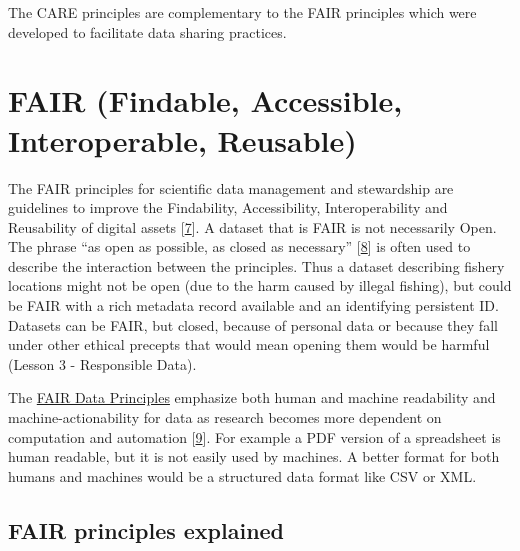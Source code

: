 \documentclass[
  letterpaper,
  DIV=11,
  numbers=noendperiod]{scrreport}
\begin{document}
The CARE principles are complementary to the FAIR principles which were
developed to facilitate data sharing practices.

\hypertarget{fair-findable-accessible-interoperable-reusable}{%
\section{FAIR (Findable, Accessible, Interoperable,
Reusable)}\label{fair-findable-accessible-interoperable-reusable}}

The FAIR principles for scientific data management and stewardship are
guidelines to improve the Findability, Accessibility, Interoperability
and Reusability of digital assets
{[}\href{https://doi.org/10.1038/sdata.2016.18}{7}{]}. A dataset that is
FAIR is not necessarily Open. The phrase ``as open as possible, as
closed as necessary''
{[}\href{https://ec.europa.eu/research/participants/data/ref/h2020/grants_manual/hi/oa_pilot/h2020-hi-oa-data-mgt_en.pdf}{8}{]}
is often used to describe the interaction between the principles. Thus a
dataset describing fishery locations might not be open (due to the harm
caused by illegal fishing), but could be FAIR with a rich metadata
record available and an identifying persistent ID. Datasets can be FAIR,
but closed, because of personal data or because they fall under other
ethical precepts that would mean opening them would be harmful (Lesson 3
- Responsible Data).

The \href{https://www.go-fair.org/fair-principles/}{FAIR Data
Principles} emphasize both human and machine readability and
machine-actionability for data as research becomes more dependent on
computation and automation
{[}\href{https://www.go-fair.org/fair-principles/}{9}{]}. For example a
PDF version of a spreadsheet is human readable, but it is not easily
used by machines. A better format for both humans and machines would be
a structured data format like CSV or XML.

\hypertarget{fair-principles-explained}{%
\subsection{FAIR principles explained}\label{fair-principles-explained}}
\end{document}
